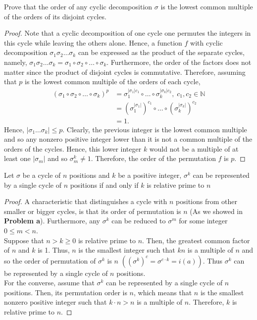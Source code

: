 \documentclass[12pt]{article}
\newcommand{\N}{\mathbb{N}}
\newenvironment{problem}[2][Problem]{\begin{trivlist} \item[\hskip \labelsep {\bfseries #1}\hskip \labelsep {\bfseries #2.}]}{\end{trivlist}}
\begin{document}
\begin{problem}{b}
  Prove that the order of any cyclic decomposition $\sigma$ is the lowest common multiple of the orders of its disjoint cycles. 
  \begin{proof}
    Note that a cyclic decomposition of one cycle one permutes the integers in this cycle while leaving the others alone. Hence, a function $f$ with cyclic decomposition $\sigma_{1}\sigma_{2}\dots\sigma_{k}$ can be expressed as the product of the separate cycles, namely, $\sigma_{1}\sigma_{2}\dots\sigma_{k} = \sigma_{1}\circ\sigma_{2}\circ\dots\circ\sigma_{k}$. Furthermore, the order of the factors does not matter since the product of disjoint cycles is commutative. Therefore, assuming that $p$ is the lowest common multiple of the orders of each cycle, 
    \begin{align*}
      \left(\sigma_{1}\circ\sigma_{2}\circ\dots\circ\sigma_{k}\right)^{p} &= \sigma_{1}^{|\sigma_{1}|c_{1}}\circ\dots\circ\sigma_{k}^{|\sigma_{k}|c_{2}}, \; c_{1},c_{2}\in \N\\ 
      &= \left(\sigma_{1}^{|\sigma_{1}|}\right)^{c_{1}}\circ\dots\circ\left(\sigma_{k}^{|\sigma_{k}|}\right)^{c_{2}}\\
      &= 1.
    \end{align*}
    Hence, $|\sigma_{1}\dots\sigma_{k}|\leq p$. Clearly, the previous integer is the lowest common multiple and so any nonzero positive integer lower than it is not a common multiple of the orders of the cycles. Hence, this lower integer $k$ would not be a multiple of at least one $|\sigma_{m}|$ and so $\sigma_{m}^{k}\neq 1$. Therefore, the order of the permutation $f$ is $p$.
  \end{proof}
\end{problem}
\begin{problem}{c}
  Let $\sigma$ be a cycle of $n$ positions and $k$ be a positive integer, $\sigma^{k}$ can be represented by a single cycle of $n$ positions if and only if $k$ is relative prime to $n$
  \begin{proof}
    A characteristic that distinguishes a cycle with $n$ positions from other smaller or bigger cycles, is that its order of permutation is $n$ (As we showed in \textbf{Problem a}). Furthermore, any $\sigma^{k}$ can be reduced to $\sigma^{m}$ for some integer $0\leq m<n$. \\
    Suppose that $n>k\geq 0$ is relative prime to $n$. Then, the greatest common factor of $n$ and $k$ is 1. Thus, $n$ is the smallest integer such that $kn$ is a multiple of $n$ and so the order of permutation of $\sigma^{k}$ is $n$ $\left( \left( \sigma^{k} \right)^{c} = \sigma^{c\cdot k}=i(a) \right)$. Thus $\sigma^{k}$ can be represented by a single cycle of $n$ positions.\\
    For the converse, assume that $\sigma^{k}$ can be represented by a single cycle of $n$ positions. Then, its permutation order is $n$, which means that $n$ is the smallest nonzero positive integer such that $k\cdot n>n$ is a multiple of $n$. Therefore, $k$ is relative prime to $n$.
  \end{proof}
\end{problem}
\end{document}
